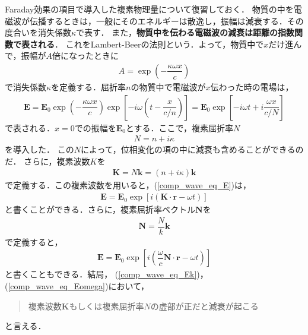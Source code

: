 Faraday効果の項目で導入した複素物理量について復習しておく．
物質の中を電磁波が伝播するときは，一般にそのエネルギーは散逸し，振幅は減衰する．その度合いを消失係数$\kappa$で表す．
また，\textbf{物質中を伝わる電磁波の減衰は距離の指数関数で表される}．
これをLambert-Beerの法則という．よって，物質中で$x$だけ進んで，振幅が$A$倍になったときに
\begin{align}
  A=\exp\left(-\dfrac{\kappa\omega{x}}{c}\right)
\end{align}
で消失係数$\kappa$を定義する．屈折率$n$の物質中で電磁波が$x$伝わった時の電場は，
\begin{align}
  \boldsymbol{E}=\boldsymbol{E}_0\exp\left(-\dfrac{\kappa\omega{x}}{c}\right)\exp\left[-i\omega\left(t-\dfrac{x}{c/n}\right)\right] = \boldsymbol{E}_0\exp\left[-i\omega{t}+i\dfrac{\omega{x}}{c/N}\right]\label{comp_wave_eq_E}
\end{align}
で表される．$x=0$での振幅を$\boldsymbol{E}_0$とする．ここで，複素屈折率$N$
\begin{align}
  N=n+i\kappa
\end{align}
を導入した．
この$N$によって，位相変化の項の中に減衰も含めることができるのだ．
さらに，複素波数$K$を
\begin{align}
  \boldsymbol{K}=N\boldsymbol{k}=(n+i\kappa)\boldsymbol{k}
\end{align}
で定義する．この複素波数を用いると，(\ref{comp_wave_eq_E})は，
\begin{align}
  \boldsymbol{E}=\boldsymbol{E}_0\exp\left[i\left(\boldsymbol{K}\cdot\boldsymbol{r}-\omega{}t\right)\right]\label{comp_wave_eq_Ek}
\end{align}
と書くことができる．さらに，複素屈折率ベクトル$\boldsymbol{N}$を
\begin{align}
  \boldsymbol{N}=\dfrac{N}{k}\boldsymbol{k}\label{comp_wave_eq_def_N}
\end{align}
で定義すると，
\begin{align}
  \boldsymbol{E}=\boldsymbol{E}_0\exp\left[i\left(\dfrac{\omega}{c}\boldsymbol{N}\cdot\boldsymbol{r}-\omega{}t\right)\right]\label{comp_wave_eq_Eomega}
\end{align}
と書くこともできる．結局，
(\ref{comp_wave_eq_Ek})，(\ref{comp_wave_eq_Eomega})において，
\begin{quote}
  複素波数$\boldsymbol{K}$もしくは複素屈折率$N$の虚部が正だと減衰が起こる
\end{quote}
と言える．

